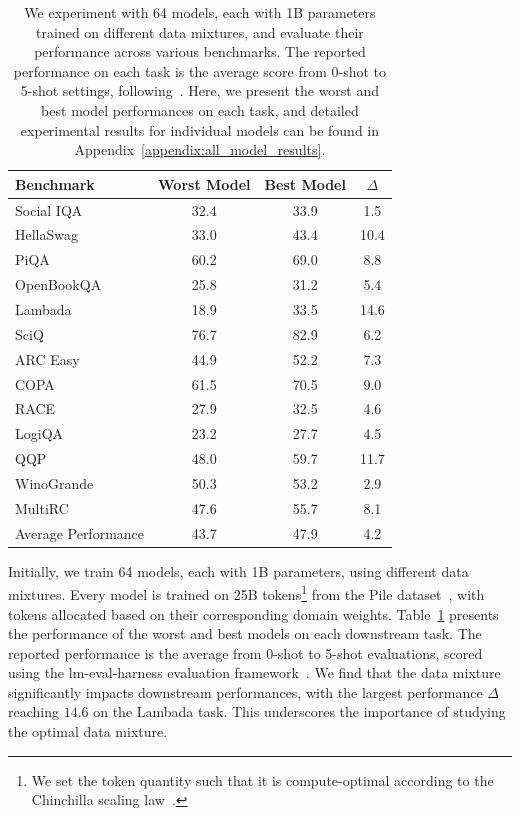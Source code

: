 \begin{table}[t]
    \centering
    \small
    \caption{We experiment with 64 models, each with 1B parameters trained on different data mixtures, and evaluate their performance across various benchmarks. The reported performance on each task is the average score from 0-shot to 5-shot settings, following~\citet{muennighoff2023scaling}. Here, we present the worst and best model performances on each task, and detailed experimental results for individual models can be found in Appendix~\ref{appendix:all_model_results}.}
    \label{tab:worst_best_model_perf}
    \begin{tabular}{l|ccc}
    \toprule
     \textbf{Benchmark} & \textbf{Worst Model} & \textbf{Best Model} & $\Delta$ \\
     \midrule
        Social IQA~\citep{sap2019socialiqa} & 32.4 & 33.9 & 1.5 \\
        HellaSwag~\citep{zellers2019hellaswag} & 33.0 & 43.4 & 10.4 \\
        PiQA~\citep{bisk2020piqa} & 60.2 & 69.0 & 8.8 \\
        OpenBookQA~\citep{mihaylov2018can} & 25.8 & 31.2 & 5.4 \\
        Lambada~\citep{paperno2016lambada} & 18.9 & 33.5 & 14.6 \\
        SciQ~\citep{welbl2017crowdsourcing} & 76.7 & 82.9 & 6.2 \\
        ARC Easy~\citep{clark2018think} & 44.9 & 52.2 & 7.3 \\
        COPA~\citep{sarlin2020superglue}  & 61.5 & 70.5 & 9.0 \\
        RACE~\citep{lai2017race}  & 27.9 & 32.5 & 4.6 \\
        LogiQA~\citep{liu2020logiqa}  & 23.2 & 27.7 & 4.5 \\
        QQP~\citep{wang2018glue}  & 48.0 & 59.7 & 11.7 \\
        WinoGrande~\citep{sakaguchi2021winogrande} & 50.3 & 53.2 & 2.9 \\
        MultiRC~\citep{khashabi2018looking} & 47.6 & 55.7 & 8.1 \\
        \midrule
        Average Performance & 43.7 & 47.9 & 4.2 \\
    \bottomrule
    \end{tabular}
\end{table}

Initially, we train 64 models, each with 1B parameters, using different data mixtures.
Every model is trained on 25B tokens\footnote{We set the token quantity such that it is compute-optimal according to the Chinchilla scaling law~\citep{hoffmann2022training}.} from the Pile dataset~\citep{the_pile_corpus}, with tokens allocated based on their corresponding domain weights.
Table~\ref{tab:worst_best_model_perf} presents the performance of the worst and best models on each downstream task. The reported performance is the average from 0-shot to 5-shot evaluations, scored using the lm-eval-harness evaluation framework~\citep{eval-harness,biderman2024lessons}. We find that the data mixture significantly impacts downstream performances, with the largest performance $\Delta$ reaching $14.6$ on the Lambada task. This underscores the importance of studying the optimal data mixture.

